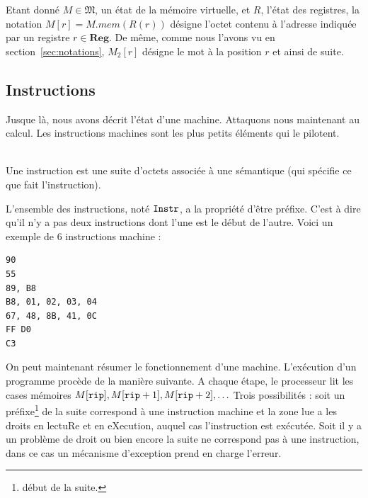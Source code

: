 \documentclass{book}
\newenvironment{formalisme}[1]{%
	\def\FrameCommand{\fboxrule=\FrameRule\fboxsep=\FrameSep \fcolorbox{red!10}{red!5}}%
	\MakeFramed {\advance\hsize-\width \FrameRestore}
	\noindent {\bf #1}\\
}%
{\endMakeFramed}
\newcommand{\rip}{{\tt rip}\xspace}
\newcommand{\Memory}{{\mathfrak{M}}}
\newcommand{\Reg}{{\mathbf{Reg}}}
\begin{document}

Etant donné $M \in \Memory$, un état de la mémoire virtuelle, et $R$, l'état des registres,  la notation $M[r] = M.mem(R(r))$ désigne l'octet contenu à l'adresse indiquée par un registre $r \in \Reg$. De même, comme nous l'avons vu en section~\ref{sec:notations}, $M_2[r]$ désigne le mot à la position $r$ et ainsi de suite.  %


\subsection{Instructions}

\newcommand{\Instr}{{\tt Instr}}

Jusque là, nous avons décrit l'état d'une machine. Attaquons nous maintenant au calcul. Les instructions machines sont les plus petits éléments qui le pilotent.

\begin{formalisme}{Instruction}
Une instruction est une suite d'octets associée à une sémantique (qui spécifie ce que fait l'instruction). 
	
L'ensemble des instructions, noté $\Instr$, a la propriété d'être préfixe. C'est à dire qu'il n'y a pas deux instructions dont l'une est le début de l'autre.  	
\end{formalisme}
Voici un exemple de 6 instructions machine : 
\begin{verbatim}
90
55
89, B8
B8, 01, 02, 03, 04
67, 48, 8B, 41, 0C
FF D0
C3
\end{verbatim}

On peut maintenant résumer le fonctionnement d'une machine.  L'exécution d'un programme procède de la manière suivante. A chaque étape, le processeur lit les cases mémoires $M[\rip], M[\rip+1], M[\rip+2], \ldots$ Trois possibilités :  soit un préfixe\footnote{début de la suite.} de la suite correspond à une instruction machine  et la zone lue a les droits en lectuRe et en eXecution, auquel cas l'instruction est exécutée. Soit il y a un problème de droit ou bien encore la suite ne correspond pas à une instruction, dans ce cas un mécanisme d'exception prend en charge l'erreur. 
\end{document}
